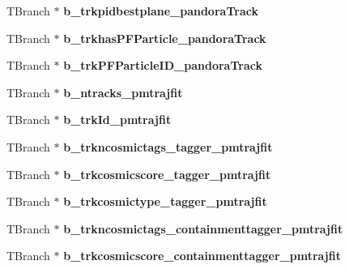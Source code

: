 \begin{DoxyCompactItemize}
\item 
\hypertarget{classanatree_ad917a19da9b5840ed834b682c57a8d79}{T\-Branch $\ast$ {\bfseries b\-\_\-trkpidbestplane\-\_\-pandora\-Track}}\label{classanatree_ad917a19da9b5840ed834b682c57a8d79}

\item 
\hypertarget{classanatree_a05c70e021e024a1915de70f58afbd422}{T\-Branch $\ast$ {\bfseries b\-\_\-trkhas\-P\-F\-Particle\-\_\-pandora\-Track}}\label{classanatree_a05c70e021e024a1915de70f58afbd422}

\item 
\hypertarget{classanatree_ae4bfbd92a467559a355e5092af30b46b}{T\-Branch $\ast$ {\bfseries b\-\_\-trk\-P\-F\-Particle\-I\-D\-\_\-pandora\-Track}}\label{classanatree_ae4bfbd92a467559a355e5092af30b46b}

\item 
\hypertarget{classanatree_a4277265208cbc22ab65154db98d20ed4}{T\-Branch $\ast$ {\bfseries b\-\_\-ntracks\-\_\-pmtrajfit}}\label{classanatree_a4277265208cbc22ab65154db98d20ed4}

\item 
\hypertarget{classanatree_a56ec5e0a46e5ebae17574ee67192fa7e}{T\-Branch $\ast$ {\bfseries b\-\_\-trk\-Id\-\_\-pmtrajfit}}\label{classanatree_a56ec5e0a46e5ebae17574ee67192fa7e}

\item 
\hypertarget{classanatree_a2d347ece74a7feaa3b3b6f84cfcc6762}{T\-Branch $\ast$ {\bfseries b\-\_\-trkncosmictags\-\_\-tagger\-\_\-pmtrajfit}}\label{classanatree_a2d347ece74a7feaa3b3b6f84cfcc6762}

\item 
\hypertarget{classanatree_a96393f76e6144f2247e0ef1a2ea6a23f}{T\-Branch $\ast$ {\bfseries b\-\_\-trkcosmicscore\-\_\-tagger\-\_\-pmtrajfit}}\label{classanatree_a96393f76e6144f2247e0ef1a2ea6a23f}

\item 
\hypertarget{classanatree_a258a0dcb534bcb3445a0e776f4a8f919}{T\-Branch $\ast$ {\bfseries b\-\_\-trkcosmictype\-\_\-tagger\-\_\-pmtrajfit}}\label{classanatree_a258a0dcb534bcb3445a0e776f4a8f919}

\item 
\hypertarget{classanatree_aa28179040a444e1a0406d75a9613f6a6}{T\-Branch $\ast$ {\bfseries b\-\_\-trkncosmictags\-\_\-containmenttagger\-\_\-pmtrajfit}}\label{classanatree_aa28179040a444e1a0406d75a9613f6a6}

\item 
\hypertarget{classanatree_a0bb8556488bdf0db83ed7e69c382eaa2}{T\-Branch $\ast$ {\bfseries b\-\_\-trkcosmicscore\-\_\-containmenttagger\-\_\-pmtrajfit}}\label{classanatree_a0bb8556488bdf0db83ed7e69c382eaa2}


\end{DoxyCompactItemize}
